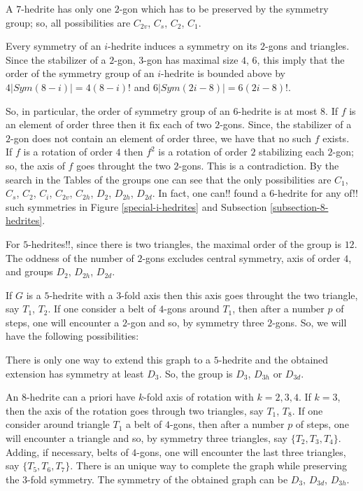 \documentclass[12pt]{article}
\begin{document}
A $7$-hedrite has only one $2$-gon which has to be preserved by the symmetry group; so, all possibilities are $C_{2v}$, $C_s$, $C_2$, $C_1$.

Every symmetry of an $i$-hedrite induces a symmetry on its $2$-gons and triangles. Since the stabilizer of a $2$-gon, $3$-gon has maximal size $4$, $6$, this imply that the order of the symmetry group of an $i$-hedrite is bounded above by $4|Sym(8-i)|=4(8-i)!$ and $6|Sym(2i-8)|=6(2i-8)!$.

So, in particular, the order of symmetry group of an $6$-hedrite is at most $8$. If $f$ is an element of order three then it fix each of two $2$-gons. Since, the stabilizer of a $2$-gon does not contain an element of order three, we have that no such $f$ exists. If $f$ is a rotation of order $4$ then $f^2$ is a rotation of order $2$ stabilizing each $2$-gon; so, the axis of $f$ goes throught the two $2$-gons. This is a contradiction. By the search in the Tables of the groups one can see that the only possibilities are $C_1$, $C_s$, $C_2$, $C_i$, $C_{2v}$, $C_{2h}$, $D_2$, $D_{2h}$, $D_{2d}$. In fact, one can!! found 
a $6$-hedrite for any of!! such symmetries in Figure \ref{special-i-hedrites} and Subsection \ref{subsection-8-hedrites}.


For $5$-hedrites!!, since there is two triangles, the maximal order of the group is $12$. The oddness of the number of $2$-gons excludes central symmetry, axis of order $4$, and groups $D_2$, $D_{2h}$, $D_{2d}$.

If $G$ is a $5$-hedrite with a $3$-fold axis then this axis goes throught the two triangle, say $T_1$, $T_2$. If one consider a belt of $4$-gons around $T_1$, then after a number $p$ of steps, one will encounter a $2$-gon and so, by symmetry three $2$-gons. So, we will have the following possibilities:

\begin{center}
\epsfxsize=60mm
\end{center}

There is only one way to extend this graph to a $5$-hedrite and the obtained extension has symmetry at least $D_3$. So, the group is $D_{3}$, $D_{3h}$ or $D_{3d}$.

An $8$-hedrite can a priori have $k$-fold axis of rotation with $k=2, 3, 4$. If $k=3$, then the axis of the rotation goes through two triangles, say $T_1$, $T_8$. If one consider around triangle $T_1$ a belt of $4$-gons, then after a number $p$ of steps, one will encounter a triangle and so, by symmetry three triangles, say $\{T_2, T_3, T_4\}$. Adding, if necessary, belts of $4$-gons, one will encounter the last three triangles, say $\{T_5, T_6, T_7\}$. There is an unique way to complete the graph while preserving the $3$-fold symmetry. The symmetry of the obtained graph can be $D_3$, $D_{3d}$, $D_{3h}$. 
\end{document}
